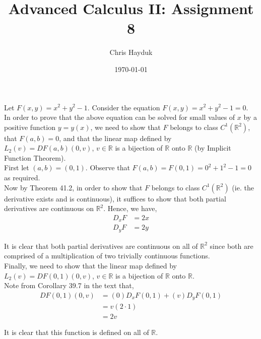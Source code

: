 \documentclass[12pt]{article}
\newenvironment{problem}[2][Problem]{\begin{trivlist}
\item[\hskip \labelsep {\bfseries #1}\hskip \labelsep {\bfseries #2.}]}{\end{trivlist}}
\begin{document}
\title{Advanced Calculus II: Assignment 8}

\author{Chris Hayduk}
\date{\today}

\maketitle

\begin{problem}{1}
\end{problem}

Let $F(x, y) = x^2 + y^2 - 1$. Consider the equation $F(x, y) = x^2 + y^2 - 1 = 0$.\\

In order to prove that the above equation can be solved for small values of $x$ by a positive function $y = y(x)$, we need to show that $F$ belongs to class $C^1(\mathbb{R}^2)$, that $F(a, b) = 0$, and that the linear map defined by $L_2(v) = DF(a, b)(0, v)$, $v \in \mathbb{R}$ is a bijection of $\mathbb{R}$ onto $\mathbb{R}$ (by Implicit Function Theorem).\\

First let $(a, b) = (0, 1)$. Observe that $F(a, b) = F(0, 1) = 0^2 + 1^2 - 1 = 0$ as required.\\

Now by Theorem 41.2, in order to show that $F$ belongs to class $C^1(\mathbb{R}^2)$ (ie. the derivative exists and is continuous), it suffices to show that both partial derivatives are continuous on $\mathbb{R}^2$. Hence, we have,
\begin{align*}
D_x F &= 2x\\
D_y F &= 2y
\end{align*}

It is clear that both partial derivatives are continuous on all of $\mathbb{R}^2$ since both are comprised of a multiplication of two trivially continuous functions.\\

Finally, we need to show that the linear map defined by $L_2(v) = DF(0, 1)(0, v)$, $v \in \mathbb{R}$ is a bijection of $\mathbb{R}$ onto $\mathbb{R}$.\\

Note from Corollary 39.7 in the text that,
\begin{align*}
DF(0, 1)(0, v) &= (0)D_xF(0,1) + (v)D_yF(0, 1)\\
&= v (2 \cdot 1)\\
&= 2v
\end{align*}

It is clear that this function is defined on all of $\mathbb{R}$.\\
\end{document}
